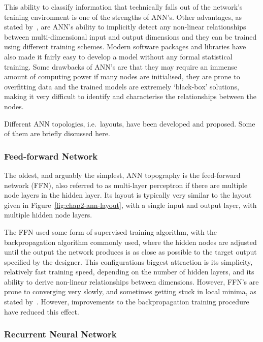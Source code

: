 This ability to classify information that technically falls out of the network's training environment is one of the strengths of ANN's. Other advantages, as stated by~\cite{tu1996advantages}, are ANN's ability to implicitly detect any non-linear relationships between multi-dimensional input and output dimensions and they can be trained using different training schemes. Modern software packages and libraries have also made it fairly easy to develop a model without any formal statistical training. Some drawbacks of ANN's are that they may require an immense amount of computing power if many nodes are initialised, they are prone to overfitting data and the trained models are extremely `black-box' solutions, making it very difficult to identify and characterise the relationships between the nodes. 

Different ANN topologies, i.e.\ layouts, have been developed and proposed. Some of them are briefly discussed here.

\subsubsection{Feed-forward Network}

The oldest, and arguably the simplest, ANN topography is the feed-forward network (FFN), also referred to as multi-layer perceptron if there are multiple node layers in the hidden layer. Its layout is typically very similar to the layout given in Figure~\ref{fig:chap2-ann-layout}, with a single input and output layer, with multiple hidden node layers. 

The FFN used some form of supervised training algorithm, with the backpropagation algorithm commonly used, where the hidden nodes are adjusted until the output the network produces is as close as possible to the target output specified by the designer. This configurations biggest attraction is its simplicity, relatively fast training speed, depending on the number of hidden layers, and its ability to derive non-linear relationships between dimensions. However, FFN's are prone to converging very slowly, and sometimes getting stuck in local minima, as stated by~\cite{svozil1997introduction}. However, improvements to the backpropagation training procedure have reduced this effect.

\subsubsection{Recurrent Neural Network}

